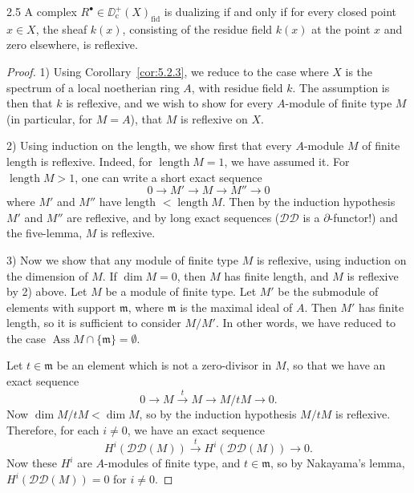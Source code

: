 \begin{bookproposition}{2.5}\label{prop:5.2.5}
A complex $R^\bullet\in\DD_{\mathrm{c}}^+(X)_{\mathrm{fid}}$ is dualizing if and only if for every closed point $x\in X$, the sheaf $k(x)$, consisting of the residue field $k(x)$ at the point $x$ and zero elsewhere, is reflexive.
\end{bookproposition}

\begin{proof}
1) Using Corollary~\ref{cor:5.2.3}, we reduce to the case where $X$ is the spectrum of a local noetherian ring $A$, with residue field $k$. The assumption is then that $k$ is reflexive, and we wish to show for every $A$-module of finite type $M$ (in particular, for $M=A$), that $M$ is reflexive on $X$.

2) Using induction on the length, we show first that every $A$-module $M$ of finite length is reflexive. Indeed, for $\operatorname{length}M=1$, we have assumed it. For $\operatorname{length}M>1$, one can write a short exact sequence
\[
0\longrightarrow M'\longrightarrow M\longrightarrow M''\longrightarrow 0
\]
where $M'$ and $M''$ have length $<\operatorname{length}M$. Then by the induction hypothesis $M'$ and $M''$ are reflexive, and by long exact sequences ($\mathscr{D}\mathscr{D}$ is a $\partial$-functor!) and the five-lemma, $M$ is reflexive.

3) Now we show that any module of finite type $M$ is reflexive, using induction on the dimension of $M$. If $\dim M=0$, then $M$ has finite length, and $M$ is reflexive by 2) above. Let $M$ be a module of finite type. Let $M'$ be the submodule of elements with support $\mathfrak{m}$, where $\mathfrak{m}$ is the maximal ideal of $A$. Then $M'$ has finite length, so it is sufficient to consider $M/M'$. In other words, we have reduced to the case $\operatorname{Ass}M\cap\{\mathfrak{m}\}=\emptyset$.

Let $t\in\mathfrak{m}$ be an element which is not a zero-divisor in $M$, so that we have an exact sequence
\[
0\longrightarrow M\xrightarrow{t} M\longrightarrow M/tM\longrightarrow 0.
\]
Now $\dim M/tM<\dim M$, so by the induction hypothesis $M/tM$ is reflexive. Therefore, for each $i\neq0$, we have an exact sequence
\[
H^{i}(\mathscr{D}\mathscr{D}(M))\xrightarrow{t}H^{i}(\mathscr{D}\mathscr{D}(M))\longrightarrow 0.
\]
Now these $H^{i}$ are $A$-modules of finite type, and $t\in\mathfrak{m}$, so by Nakayama's lemma, $H^{i}(\mathscr{D}\mathscr{D}(M))=0$ for $i\neq0$.


\end{proof}
